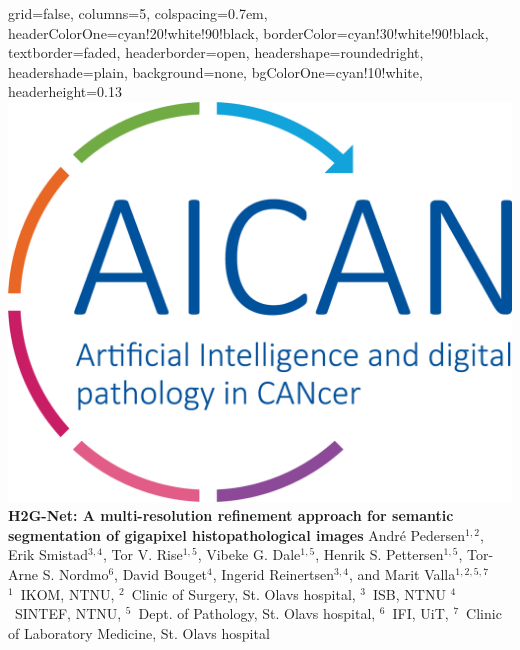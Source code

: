 \documentclass[portrait,a0paper,fontscale=0.292]{baposter}
\begin{document}
\begin{poster}{
 grid=false,
 columns=5,
 colspacing=0.7em,
 headerColorOne=cyan!20!white!90!black,
 borderColor=cyan!30!white!90!black,
 textborder=faded,
 headerborder=open,
 headershape=roundedright,
 headershade=plain,
 background=none,
 bgColorOne=cyan!10!white,
 headerheight=0.13\textheight} %
 {
      \includegraphics[width=0.15\linewidth]{figures/AICAN_logo/logo_AICAN.png}
      \makebox[0.010\textwidth]{} 
 }
 {\sc\huge\bf H2G-Net: A multi-resolution refinement approach for semantic segmentation of gigapixel histopathological images}
 {\vspace{0.3em} André Pedersen$^{1,2}$, Erik Smistad$^{3,4}$, Tor V. Rise$^{1,5}$, Vibeke G. Dale$^{1,5}$, Henrik S. Pettersen$^{1,5}$, Tor-Arne S. Nordmo$^{6}$, David Bouget$^{4}$, Ingerid Reinertsen$^{3,4}$, and Marit Valla$^{1,2,5,7}$ \\[0.2em]
 {\small{$^1$~IKOM, NTNU, $^2$~Clinic of Surgery, St. Olavs hospital, $^3$~ISB, NTNU $^4$~SINTEF, NTNU, $^5$~Dept. of Pathology, St. Olavs hospital, $^6$~IFI, UiT, $^7$~Clinic of Laboratory Medicine, St. Olavs hospital\vspace{-3.0em}}%
 }
 }


\end{poster}
\end{document}
